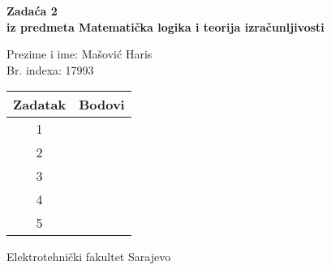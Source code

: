 \documentclass[12pt]{article}
\newcommand{\prezimeIme}{Mašović Haris}
\newcommand{\brIndexa}{17993}
\newcommand{\brZadace}{2}
\begin{document}
    
    \thispagestyle{empty}
    \begin{center}
      \vspace*{1cm}

      \vspace*{2cm}
      {\huge \bf Zadaća \brZadace } \\
      \vspace*{1cm}
      {\Large \bf iz predmeta Matematička logika i teorija izračunljivosti}

      \vspace*{2cm}

      {\Large Prezime i ime: \prezimeIme} \\
      \vspace*{0.75cm}
      {\Large Br. indexa: \brIndexa}

      \vspace*{3cm}
      \renewcommand{\arraystretch}{1.75}
      \begin{tabular}{|c|c|}
    	\hline Zadatak & Bodovi \\
    	\hline 1 &  \\
    	\hline 2 &  \\
    	\hline 3 &  \\
    	\hline 4 &  \\
    	\hline 5 &  \\
    	\hline
     \end{tabular}

      \vfill


      {\large Elektrotehnički fakultet Sarajevo}

    \end{center}
    \newpage
    \thispagestyle{empty}
    
\end{document}
